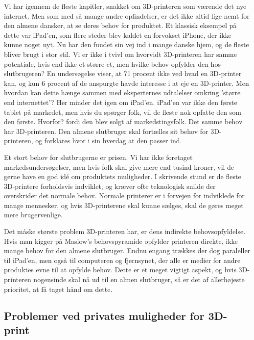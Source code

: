 Vi har igennem de fleste kapitler, snakket om 3D-printeren som værende det nye internet. Men som med så mange andre opfindelser, er det ikke altid lige nemt for den almene dansker, at se deres behov for produktet. Et klassisk eksempel på dette var iPad'en, som flere steder blev kaldet en forvokset iPhone, der ikke kunne noget nyt. Nu har den fundet sin vej ind i mange danske hjem, og de fleste bliver brugt i stor stil. 
Vi er ikke i tvivl om hvorvidt 3D-printeren har samme potentiale, hvis end ikke et større et, men hvilke behov opfylder den hos slutbrugeren? En undersøgelse viser, at 71 procent ikke ved hvad en 3D-printer kan, og kun 6 procent af de anspurgte havde interesse i at eje en 3D-printer.
Men hvordan kan dette hænge sammen med eksperternes udtalelser omkring 'større end internettet'? \autocite{financial_times_3d_2012} Her minder det igen om iPad'en. iPad'en var ikke den første tablet på markedet, men hvis du spørger folk, vil de fleste nok opfatte den som den første. Hvorfor? fordi den blev solgt af markedstingsfolk. Det samme behov har 3D-printeren. Den almene slutbruger skal fortælles sit behov for 3D-printeren, og forklares hvor i sin hverdag at den passer ind.

Et stort behov for slutbrugerne er prisen. Vi har ikke foretaget markedsundersøgelser, men hvis folk skal give mere end tusind kroner, vil de gerne have en god idé om produktets muligheder. I skrivende stund er de fleste 3D-printere forholdsvis indviklet, og kræver ofte teknologisk snilde der overskrider det normale behov. Normale printerer er i forvejen for indviklede for mange mennesker, og hvis 3D-printerene skal kunne sælges, skal de gøres meget mere brugervenlige.

Det måske største problem 3D-printeren har, er dens indirekte behovsopfyldelse. Hvis man kigger på Maslow's behovspyramide \autocite{abraham_harold_maslow_theory_1943} opfylder printeren direkte, ikke mange behov for den almene slutbruger. Endnu engang trækkes der dog paraleller til iPad'en, men også til computeren og fjernsynet, der alle er medier for andre produktes evne til at opfylde behov. Dette er et meget vigtigt aspekt, og hvis 3D-printeren nogensinde skal nå ud til en almen slutbruger, så er det af allerhøjeste prioritet, at få taget hånd om dette.

\subsection{Problemer ved privates muligheder for 3D-print} %

